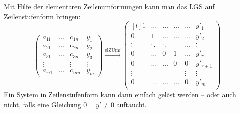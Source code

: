 	\begin{Definition}[Zeilenstufenform]
	Mit Hilfe der elementaren Zeilenumformungen kann man das LGS auf Zeilenstufenform bringen:
		\[
		\begin{pmatrix}
		a_{11} & \dots & a_{1n} & y_1 \\
		a_{21} & \dots & a_{2n} & y_2 \\
		a_{31} & \dots & a_{3n} & y_3 \\
		\vdots &       & \vdots & \vdots \\
		a_{m1} & \dots & a_{mn} & y_m
		\end{pmatrix}
		\xrightarrow{\text{elZUmf}}
                \begin{pmatrix*}[l]
			1 & \dots & \dots &\dots & \dots & y'_1\\
			0 & 1 & \dots &\dots & \dots & y'_2\\
			\vdots &\ddots & \ddots & & \dots &\vdots \\
			0  & \dots  &  0 & 1 & \dots &y'_r\\
			 0  & \dots  & \dots    & 0 & 0 & y'_{r+1}\\
			\vdots & & & & \vdots & \vdots \\
			 0 & \dots & \dots   & \dots &  0 & y'_{m}\\
		\end{pmatrix*} \]
	Ein System in Zeilenstufenform kann dann einfach gelöst werden -- oder auch nicht, falls eine Gleichung $ 0 = y' \neq 0 $ auftaucht.
	\end{Definition}
